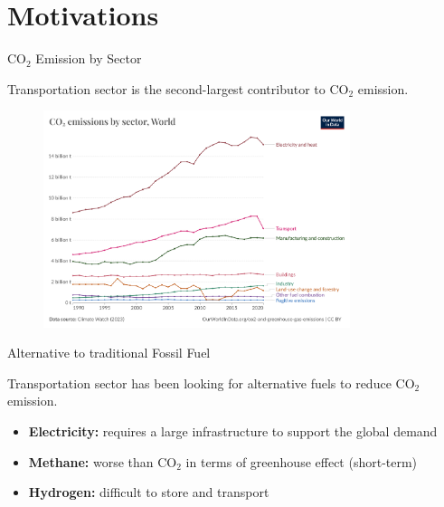\section{Motivations}

\begin{frame}{$\mathrm{CO_2}$ Emission by Sector}

    Transportation sector is the second-largest contributor to $\mathrm{CO_2}$ emission.

    \vspace{9pt}

    \begin{figure}
        \centering
        \includegraphics[width=0.8\textwidth]{img/co-emissions-by-sector.png}
    \end{figure}

\end{frame}



\begin{frame}{Alternative to traditional Fossil Fuel}

    Transportation sector has been looking for alternative fuels to reduce $\mathrm{CO_2}$ emission.

    \begin{itemize}
        \item \textbf{Electricity:} requires a large infrastructure to support the global demand
        \item \textbf{Methane:} worse than $\mathrm{CO_2}$ in terms of greenhouse effect (short-term)
        \item \textbf{Hydrogen:} difficult to store and transport
    \end{itemize}

\end{frame}



